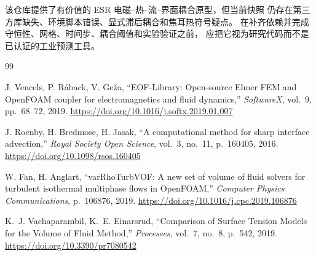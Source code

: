 \documentclass[11pt,a4paper]{article}
\begin{document}
该仓库提供了有价值的 ESR 电磁--热--流--界面耦合原型，但当前快照
仍存在第三方库缺失、环境脚本错误、显式滞后耦合和焦耳热符号疑点。
在补齐依赖并完成守恒性、网格、时间步、耦合阈值和实验验证之前，
应把它视为研究代码而不是已认证的工业预测工具。


\begin{thebibliography}{99}

J. Vencels, P. R\aa back, V. Ge\v{z}a,
``EOF-Library: Open-source Elmer FEM and OpenFOAM coupler for electromagnetics and fluid dynamics,''
\textit{SoftwareX}, vol.~9, pp.~68--72, 2019.
\url{https://doi.org/10.1016/j.softx.2019.01.007}

J. Roenby, H. Bredmose, H. Jasak,
``A computational method for sharp interface advection,''
\textit{Royal Society Open Science}, vol.~3, no.~11, p.~160405, 2016.
\url{https://doi.org/10.1098/rsos.160405}

W. Fan, H. Anglart,
``varRhoTurbVOF: A new set of volume of fluid solvers for turbulent isothermal multiphase flows in OpenFOAM,''
\textit{Computer Physics Communications}, p.~106876, 2019.
\url{https://doi.org/10.1016/j.cpc.2019.106876}

K.~J. Vachaparambil, K.~E. Einarsrud,
``Comparison of Surface Tension Models for the Volume of Fluid Method,''
\textit{Processes}, vol.~7, no.~8, p.~542, 2019.
\url{https://doi.org/10.3390/pr7080542}

\end{thebibliography}
\end{document}
